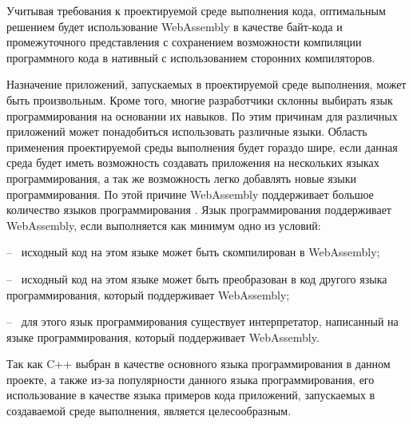 Учитывая требования к проектируемой среде выполнения кода, оптимальным решением будет использование WebAssembly в качестве байт-кода и промежуточного представления с сохранением возможности компиляции программного кода в нативный с использованием сторонних компиляторов.

Назначение приложений, запускаемых в проектируемой среде выполнения, может быть произвольным. 
Кроме того, многие разработчики склонны выбирать язык программирования на основании их навыков.
По этим причинам для различных приложений может понадобиться использовать различные языки.
Область применения проектируемой среды выполнения будет гораздо шире, если данная среда будет иметь возможность создавать приложения на нескольких языках программирования, а так же возможность легко добавлять новые языки программирования.
По этой причине WebAssembly поддерживает большое количество языков программирования \cite{WASMLanguages}.
Язык программирования поддерживает WebAssembly, если выполняется как минимум одно из условий:

-- ~исходный код на этом языке может быть скомпилирован в WebAssembly;

-- ~исходный код на этом языке может быть преобразован в код другого языка программирования, который поддерживает WebAssembly;

-- ~для этого язык программирования существует интерпретатор, написанный на языке программирования, который поддерживает WebAssembly.

Так как C++ выбран в качестве основного языка программирования в данном проекте, а также из-за популярности данного языка программирования, его использование в качестве языка примеров кода приложений, запускаемых в создаваемой среде выполнения, является целесообразным.
